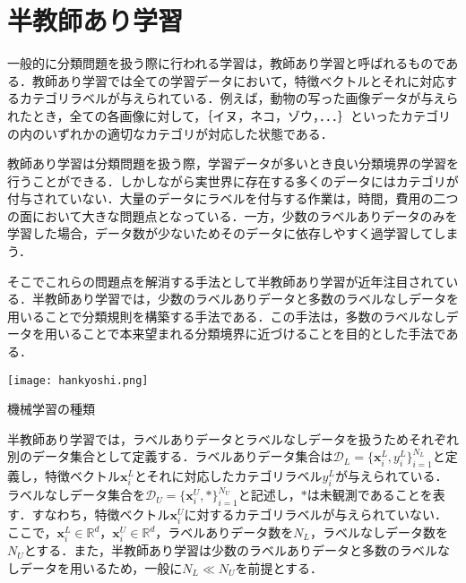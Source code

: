 \section{半教師あり学習}
一般的に分類問題を扱う際に行われる学習は，教師あり学習と呼ばれるものである．教師あり学習では全ての学習データにおいて，特徴ベクトルとそれに対応するカテゴリラベルが与えられている．例えば，動物の写った画像データが与えられたとき，全ての各画像に対して，｛イヌ，ネコ，ゾウ，．．．｝といったカテゴリの内のいずれかの適切なカテゴリが対応した状態である．\par
教師あり学習は分類問題を扱う際，学習データが多いとき良い分類境界の学習を行うことができる．しかしながら実世界に存在する多くのデータにはカテゴリが付与されていない．大量のデータにラベルを付与する作業は，時間，費用の二つの面において大きな問題点となっている．一方，少数のラベルありデータのみを学習した場合，データ数が少ないためそのデータに依存しやすく過学習してしまう．\par
そこでこれらの問題点を解消する手法として半教師あり学習が近年注目されている．半教師あり学習では，少数のラベルありデータと多数のラベルなしデータを用いることで分類規則を構築する手法である．この手法は，多数のラベルなしデータを用いることで本来望まれる分類境界に近づけることを目的とした手法である．


\vspace{2.0mm}
\begin{figurehere}
\begin{center}
  \texttt{[image: hankyoshi.png]}\par
\caption{機械学習の種類\cite{semi}}
\label{機械学習の種類}
\end{center}\par
\end{figurehere}
\newpage
半教師あり学習では，ラベルありデータとラベルなしデータを扱うためそれぞれ別のデータ集合として定義する．ラベルありデータ集合は$\mathcal D_L = \{\bm{x}_i^L,y_i^L\}_{i=1}^{N_L}$と定義し，特徴ベクトル$\bm{x}_i^L$とそれに対応したカテゴリラベル$y_i^L$が与えられている．ラベルなしデータ集合を$\mathcal D_U = \{\bm{x}_i^U,*\}_{i=1}^{N_U}$と記述し，$*$は未観測であることを表す．すなわち，特徴ベクトル$\bm{x}_i^U$に対するカテゴリラベルが与えられていない．ここで，$\bm{x}_i^L\in\mathbb{R}^d$，$\bm{x}_i^U\in\mathbb{R}^d$，ラベルありデータ数を$N_L$，ラベルなしデータ数を$N_U$とする．また，半教師あり学習は少数のラベルありデータと多数のラベルなしデータを用いるため，一般に$N_L\ll N_U$を前提とする．



